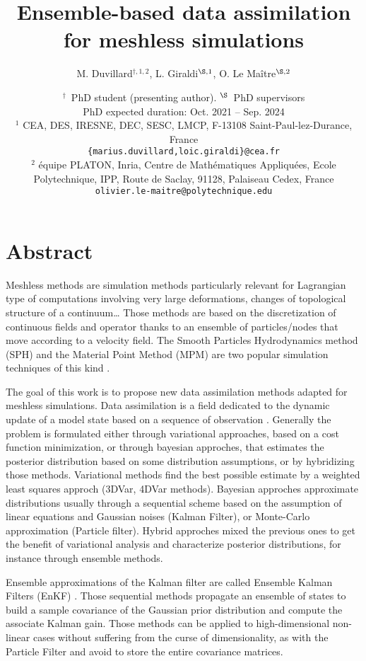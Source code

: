 \documentclass[a4paper,10pt,oneside]{article}
\title{%
  Ensemble-based data assimilation for meshless simulations}
\author{%
  M. Duvillard${}^{\dagger,1,2}$, %
  L. Giraldi${}^{\S,1}$, %
  O. Le Maître${}^{\S,2}$}%
\date{\medskip%
  \small %
  ${}^\dagger$\ PhD student (presenting author). \quad ${}^{\S}$\ PhD supervisors\\[5pt]
  PhD expected duration: {Oct. 2021 -- Sep. 2024}\\[15pt]
  ${}^1$  CEA, DES, IRESNE, DEC, SESC, LMCP, F-13108 Saint-Paul-lez-Durance, France\\
  \texttt{\{marius.duvillard,loic.giraldi\}@cea.fr}\\[4pt]
  ${}^2$ équipe PLATON, Inria, Centre de Mathématiques Appliquées, Ecole Polytechnique, IPP, Route de Saclay, 91128, Palaiseau Cedex, France\\
  \texttt{olivier.le-maitre@polytechnique.edu}}
\begin{document}
\maketitle

\thispagestyle{fancy}

\section*{Abstract}

Meshless methods are simulation methods particularly relevant for Lagrangian type of computations involving very large deformations, changes of topological structure of a continuum\dots
Those methods are based on the discretization of continuous fields and operator thanks to an ensemble of particles/nodes that move according to a velocity field. The Smooth Particles Hydrodynamics method (SPH) and the Material Point Method (MPM) are two popular simulation techniques of this kind \cite{de_vaucorbeil_material_2020,zhang_smoothed_2022}.

The goal of this work is to propose new data assimilation methods adapted for meshless simulations. Data assimilation is a field dedicated to the dynamic update of a model state based on a sequence of observation \cite{asch_data_2016,evensen_data_2022}. Generally the problem is formulated either through variational approaches, based on a cost function minimization, or through bayesian approches, that estimates the posterior distribution based on some distribution assumptions, or by hybridizing those methods. Variational methods find the best possible estimate by a weighted least squares approch (3DVar, 4DVar methods). Bayesian approches approximate distributions usually through a sequential scheme based on the assumption of linear equations and Gaussian noises (Kalman Filter), or Monte-Carlo approximation (Particle filter). Hybrid approches mixed the previous ones to get the benefit of variational analysis and characterize posterior distributions, for instance through ensemble methods.

Ensemble approximations of the Kalman filter are called Ensemble Kalman Filters (EnKF) \cite{evensen_sequential_1994}. Those sequential methods propagate an ensemble of states to build a sample covariance of the Gaussian prior distribution and compute the associate Kalman gain. Those methods can be applied to high-dimensional non-linear cases without suffering from the curse of dimensionality, as with the Particle Filter and avoid to store the entire covariance matrices.
\end{document}
